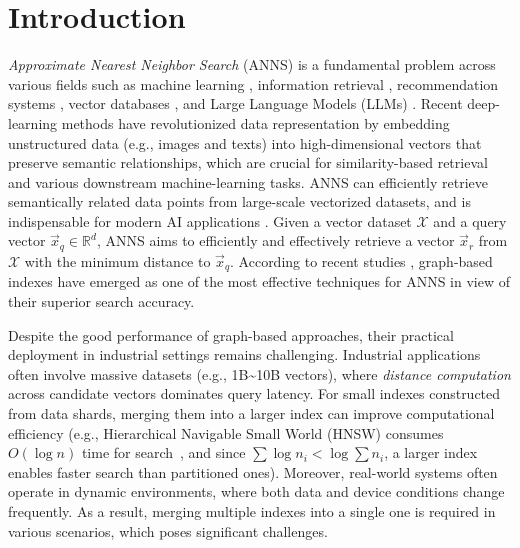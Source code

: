 \documentclass[acmsmall]{acmart}
\theoremstyle{remark}
\theoremstyle{definition}
\begin{document}
\maketitle

\section{Introduction}
\label{sec:introduction}

\textit{Approximate Nearest Neighbor Search} (ANNS) \cite{arya1993approximate,arya1998optimal} is a fundamental problem across various fields such as machine learning \cite{cost1993weighted, wang2020survey}, information retrieval \cite{wang2012scalable, zhu2019accelerating}, recommendation systems \cite{das2007google,meng2020pmd}, vector databases \cite{wang2021milvus}, and Large Language Models (LLMs) \cite{dobson2023scaling, asai2023retrieval}. Recent deep-learning methods have revolutionized data representation by embedding unstructured data (e.g., images and texts) into high-dimensional vectors that preserve semantic relationships, which are crucial for similarity-based retrieval and various downstream machine-learning tasks. ANNS can efficiently retrieve semantically related data points from large-scale vectorized datasets, and is indispensable for modern AI applications \cite{asai2023retrieval, lewis2020retrieval, liu2024retrievalattention}. Given a vector dataset $\mathcal{X}$ and a query vector $\vec{x}_q \in \mathbb{R}^d$, ANNS aims to efficiently and effectively retrieve a vector $\vec{x}_r$ from $\mathcal{X}$ with the minimum distance to $\vec{x}_q$. According to recent studies \cite{naidan2015permutation,aumuller2020ann,li2019approximate,wang2021comprehensive}, graph-based indexes have emerged as one of the most effective techniques for ANNS in view of their superior search accuracy.

Despite the good performance of graph-based approaches, their practical deployment in industrial settings remains challenging. Industrial applications often involve massive datasets (e.g., 1B\textasciitilde10B vectors), where \textit{distance computation} across candidate vectors dominates query latency. For small indexes constructed from data shards, merging them into a larger index can improve computational efficiency (e.g., Hierarchical Navigable Small World (HNSW) \cite{malkov2018efficient} consumes $O(\log{n})$ time for search~\cite{wang2021comprehensive}, and since $\sum \log{n_i} < \log{\sum n_i}$, a larger index enables faster search than partitioned ones). Moreover, real-world systems often operate in dynamic environments, where both data and device conditions change frequently. As a result, merging multiple indexes into a single one is required in various scenarios, which poses significant challenges. 
\end{document}
